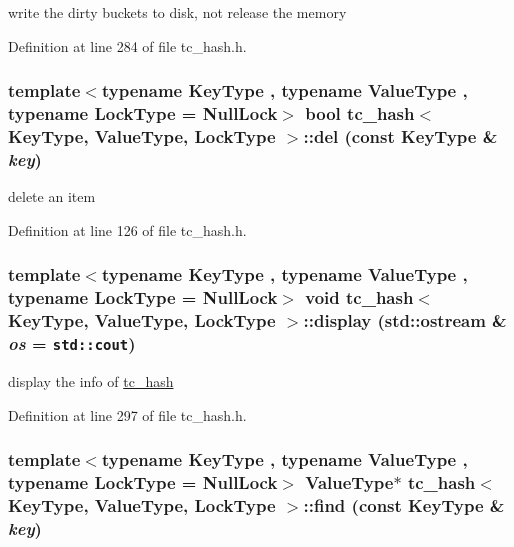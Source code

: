 write the dirty buckets to disk, not release the memory 

Definition at line 284 of file tc\_\-hash.h.\hypertarget{classtc__hash_ace3bd9142e9e66ca01aa0de990d145e}{
\subsubsection[{del}]{\setlength{\rightskip}{0pt plus 5cm}template$<$typename KeyType , typename ValueType , typename LockType  = NullLock$>$ bool {\bf tc\_\-hash}$<$ KeyType, ValueType, LockType $>$::del (const KeyType \& {\em key})}}
\label{classtc__hash_ace3bd9142e9e66ca01aa0de990d145e}


delete an item 

Definition at line 126 of file tc\_\-hash.h.\hypertarget{classtc__hash_b29bf2580a2dc3b10497ea920bf98f00}{
\subsubsection[{display}]{\setlength{\rightskip}{0pt plus 5cm}template$<$typename KeyType , typename ValueType , typename LockType  = NullLock$>$ void {\bf tc\_\-hash}$<$ KeyType, ValueType, LockType $>$::display (std::ostream \& {\em os} = {\tt std::cout})}}
\label{classtc__hash_b29bf2580a2dc3b10497ea920bf98f00}


display the info of \hyperlink{classtc__hash}{tc\_\-hash} 

Definition at line 297 of file tc\_\-hash.h.\hypertarget{classtc__hash_f6288e85c3973f121c25a39c0cab55ec}{
\subsubsection[{find}]{\setlength{\rightskip}{0pt plus 5cm}template$<$typename KeyType , typename ValueType , typename LockType  = NullLock$>$ ValueType$\ast$ {\bf tc\_\-hash}$<$ KeyType, ValueType, LockType $>$::find (const KeyType \& {\em key})}}
\label{classtc__hash_f6288e85c3973f121c25a39c0cab55ec}


